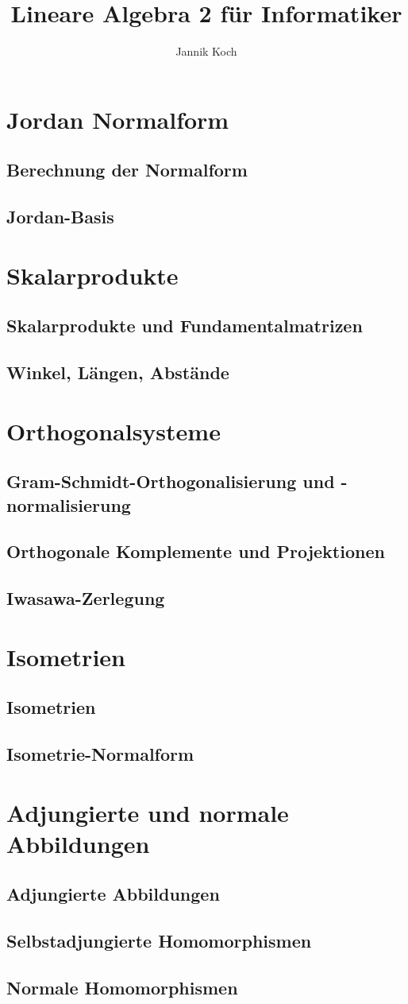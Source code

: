 \documentclass[10pt,a4paper]{article}
\author{Jannik Koch}
\title{Lineare Algebra 2 für Informatiker}
\begin{document}
	{\let\newpage\relax\maketitle}
	\tableofcontents
	\newpage
	\setcounter{page}{1}

	\section{Jordan Normalform}
	\subsection{Berechnung der Normalform}
	\subsection{Jordan-Basis}
	\section{Skalarprodukte}
	\subsection{Skalarprodukte und Fundamentalmatrizen}
	\subsection{Winkel, Längen, Abstände}
	\section{Orthogonalsysteme}
	\subsection{Gram-Schmidt-Orthogonalisierung und -normalisierung}
	\subsection{Orthogonale Komplemente und Projektionen}
	\subsection{Iwasawa-Zerlegung}
	\section{Isometrien}
	\subsection{Isometrien}
	\subsection{Isometrie-Normalform}
	\section{Adjungierte und normale Abbildungen}
	\subsection{Adjungierte Abbildungen}
	\subsection{Selbstadjungierte Homomorphismen}
	\subsection{Normale Homomorphismen}
\end{document}
